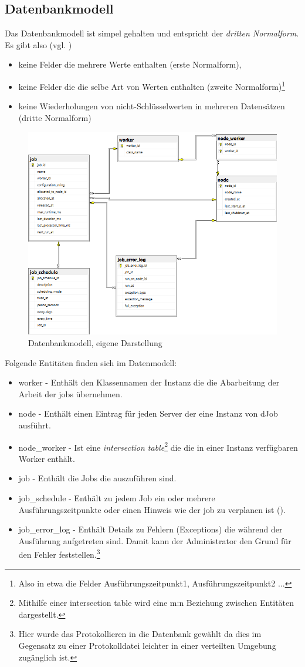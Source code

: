 \subsection{Datenbankmodell}
Das Datenbankmodell ist simpel gehalten und entspricht der \emph{dritten Normalform}. Es gibt also (vgl. \parencite[S. 317ff]{dbgrund})\begin{itemize}
	\item keine Felder die mehrere Werte enthalten (erste Normalform),
	\item keine Felder die die selbe Art von Werten enthalten (zweite Normalform)\footnote{Also in etwa die Felder Ausführungszeitpunkt1, Ausführungszeitpunkt2 ...}
	\item keine Wiederholungen von nicht-Schlüsselwerten in mehreren Datensätzen (dritte Normalform)
\end{itemize}
\begin{figure}
	\centering
	\includegraphics[width=0.7\linewidth]{images/dbmodel.png}
	\caption{Datenbankmodell, eigene Darstellung}
	\label{fig:dbmodel}
\end{figure}
Folgende Entitäten finden sich im Datenmodell:
\begin{itemize}
	\item worker - Enthält den Klassennamen der Instanz die die Abarbeitung der Arbeit der jobs übernehmen.
	\item node - Enthält einen Eintrag für jeden Server der eine Instanz von dJob ausführt.
	\item node\_worker - Ist eine \emph{intersection table}\footnote{Mithilfe einer intersection table wird eine m:n Beziehung zwischen Entitäten dargestellt.\parencite{oracle_intersection}} die die in einer Instanz verfügbaren Worker enthält.
	\item job - Enthält die Jobs die auszuführen sind. 
	\item job\_schedule - Enthält zu jedem Job ein oder mehrere Ausführungszeitpunkte oder einen Hinweis wie der job zu verplanen ist ().
	\item job\_error\_log - Enthält Details zu Fehlern (Exceptions) die während der Ausführung aufgetreten sind. Damit kann der Administrator den Grund für den Fehler feststellen.\footnote{Hier wurde das Protokollieren in die Datenbank gewählt da dies im Gegensatz zu einer Protokolldatei leichter in einer verteilten Umgebung zugänglich ist.}
\end{itemize}
